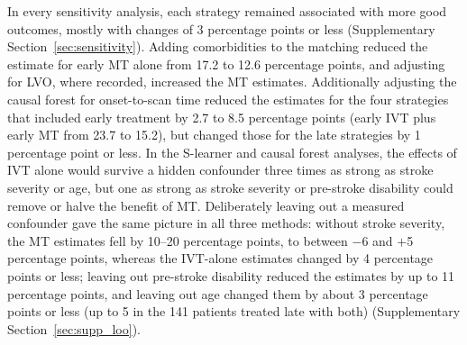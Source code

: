 In every sensitivity analysis, each strategy remained associated with more good outcomes, mostly with changes of 3 percentage points or less (Supplementary Section~\ref{sec:sensitivity}). Adding comorbidities to the matching reduced the estimate for early MT alone from 17.2 to 12.6 percentage points, and adjusting for LVO, where recorded, increased the MT estimates. Additionally adjusting the causal forest for onset-to-scan time reduced the estimates for the four strategies that included early treatment by 2.7 to 8.5 percentage points (early IVT plus early MT from 23.7 to 15.2), but changed those for the late strategies by 1 percentage point or less. In the S-learner and causal forest analyses, the effects of IVT alone would survive a hidden confounder three times as strong as stroke severity or age, but one as strong as stroke severity or pre-stroke disability could remove or halve the benefit of MT. Deliberately leaving out a measured confounder gave the same picture in all three methods: without stroke severity, the MT estimates fell by 10--20 percentage points, to between $-$6 and $+$5 percentage points, whereas the IVT-alone estimates changed by 4 percentage points or less; leaving out pre-stroke disability reduced the estimates by up to 11 percentage points, and leaving out age changed them by about 3 percentage points or less (up to 5 in the 141 patients treated late with both) (Supplementary Section~\ref{sec:supp_loo}).
